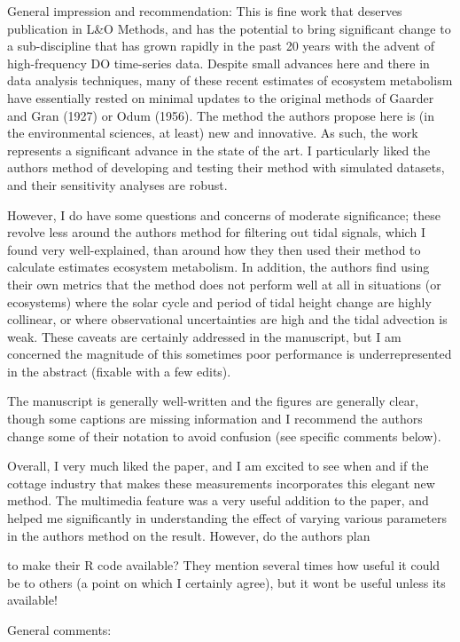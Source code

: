 \documentclass[letterpaper,12pt]{article}\usepackage[]{graphicx}\usepackage[]{color}
\begin{document}
General impression and recommendation: This is fine work that deserves publication in L\&O Methods, and has the potential to bring significant change to a sub-discipline that has grown rapidly in the past 20 years with the advent of high-frequency DO time-series data. Despite small advances here and there in data analysis techniques, many of these recent estimates of ecosystem metabolism have essentially rested on minimal updates to the original methods of Gaarder and Gran (1927) or Odum (1956). The method the authors propose here is (in the environmental sciences, at least) new and innovative. As such, the work represents a significant advance in the state of the art. I particularly liked the authors method of developing and testing their method with simulated datasets, and their sensitivity analyses are robust.

However, I do have some questions and concerns of moderate significance; these revolve less around the authors method for filtering out tidal signals, which I found very well-explained, than around how they then used their method to calculate estimates ecosystem metabolism. In addition, the authors find using their own metrics that the method does not perform well at all in situations (or ecosystems) where the solar cycle and period of tidal height change are highly collinear, or where observational uncertainties are high and the tidal advection is weak. These caveats are certainly addressed in the manuscript, but I am concerned the magnitude of this sometimes poor performance is underrepresented in the abstract (fixable with a few edits).

The manuscript is generally well-written and the figures are generally clear, though some captions are missing information and I recommend the authors change some of their notation to avoid confusion (see specific comments below).

Overall, I very much liked the paper, and I am excited to see when and if the cottage industry that makes these measurements incorporates this elegant new method. The multimedia feature was a very useful addition to the paper, and helped me significantly in understanding the effect
of varying various parameters in the authors method on the result. However, do the authors plan
 
to make their R code available? They mention several times how useful it could be to others (a
point on which I certainly agree), but it wont be useful unless its available!

General comments:
\end{document}
